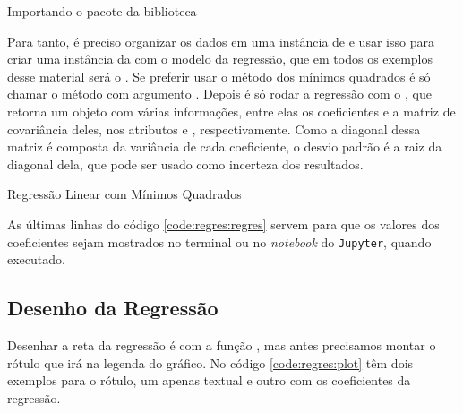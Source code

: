     \begin{listing}[H]
        \caption{Importando o pacote  da biblioteca \scipy}
        \label{code:regres:odr}

    \end{listing}

    Para tanto, é preciso organizar os dados em uma instância de  e usar isso para criar uma instância da  com o modelo da regressão, que em todos os exemplos desse material será o . Se preferir usar o método dos mínimos quadrados é só chamar o método  com argumento . Depois é só rodar a regressão com o , que retorna um objeto  com várias informações, entre elas os coeficientes e a matriz de covariância deles, nos atributos  e , respectivamente. Como a diagonal dessa matriz é composta da variância de cada coeficiente, o desvio padrão é a raiz da diagonal dela, que pode ser usado como incerteza dos resultados.

    \begin{listing}[H]
        \caption{Regressão Linear com Mínimos Quadrados}
        \label{code:regres:regres}

    \end{listing}

    As últimas linhas do código \ref{code:regres:regres} servem para que os valores dos coeficientes sejam mostrados no terminal ou no \textit{notebook} do \texttt{Jupyter}, quando executado.


\subsection{Desenho da Regressão}

    Desenhar a reta da regressão é com a função , mas antes precisamos montar o rótulo que irá na legenda do gráfico. No código \ref{code:regres:plot} têm dois exemplos para o rótulo, um apenas textual e outro com os coeficientes da regressão.

